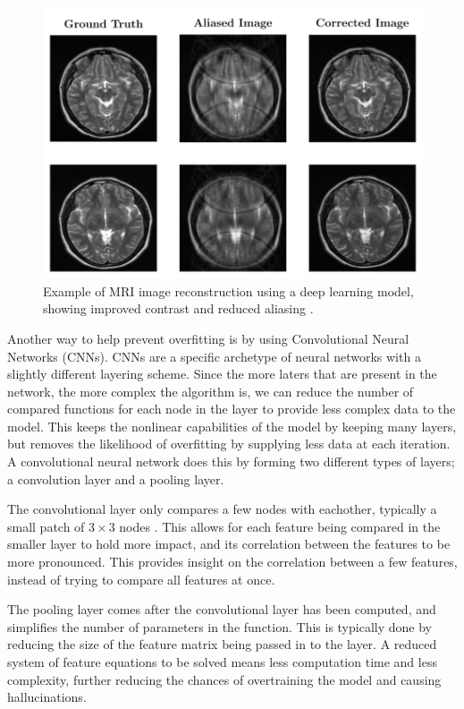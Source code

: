 \documentclass[14pt]{extreport}
\begin{document}
        \begin{figure}[h]
            \begin{center}
                \includegraphics[width = 0.6\linewidth]{Brain Images Corrected.png}
                \caption{Example of MRI image reconstruction using a deep learning model, showing improved contrast and reduced aliasing \cite{Hyun_Kim_Lee_Lee_Seo_2018}.}
            \end{center}
        \end{figure}

        Another way to help prevent overfitting is by using Convolutional Neural Networks (CNNs). CNNs are a specific archetype of neural networks with a slightly different layering scheme. Since the more laters that are present in the network, the more complex the algorithm is, we can reduce the number of compared functions for each node in the layer to provide less complex data to the model. This keeps the nonlinear capabilities of the model by keeping many layers, but removes the likelihood of overfitting by supplying less data at each iteration. A convolutional neural network does this by forming two different types of layers; a convolution layer and a pooling layer. 

        The convolutional layer only compares a few nodes with eachother, typically a small patch of $3\times3$ nodes \cite{Liu_Pan_Li_Chen_Tang_Lu_Wang_2018}. This allows for each feature being compared in the smaller layer to hold more impact, and its correlation between the features to be more pronounced. This provides insight on the correlation between a few features, instead of trying to compare all features at once.

        The pooling layer comes after the convolutional layer has been computed, and simplifies the number of parameters in the function. This is typically done by reducing the size of the feature matrix being passed in to the layer. A reduced system of feature equations to be solved means less computation time and less complexity, further reducing the chances of overtraining the model and causing hallucinations.
\end{document}
